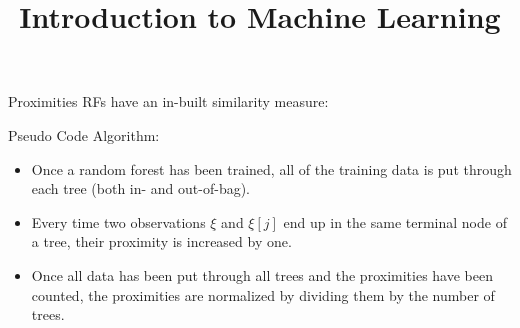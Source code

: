 \documentclass[11pt,compress,t,notes=noshow, xcolor=table]{beamer}
\title{Introduction to Machine Learning}
\begin{document}

\begin{vbframe}{Proximities}
RFs have an in-built similarity measure: 

%

\end{vbframe}

\begin{vbframe}{Pseudo Code}
Algorithm:
\begin{itemize}
\item Once a random forest has been trained, all of the training data is put through each tree (both in- and out-of-bag).
\item Every time two observations $\xi$ and $\xi[j]$ end up in the same terminal node of a tree, their proximity is increased by one. 
\item Once all data has been put through all trees and the proximities have been counted, the proximities are normalized by dividing them by the number of trees.
\end{itemize}
\end{vbframe}
\end{document}
